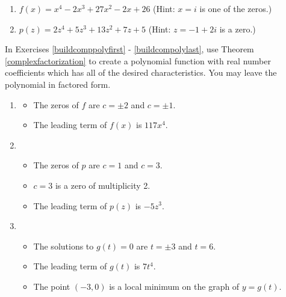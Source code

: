 \documentclass{ximera}
\begin{document}
\begin{enumerate}
\setcounter{enumi}{\value{HW}}

\item $f(x) = x^{4} - 2x^{3} + 27x^{2} - 2x + 26$ (Hint: $x = i$ is one of the zeros.)
\item  $p(z) = 2z^4+5z^3+13z^2+7z+5$ (Hint:  $z = -1+2i$ is a zero.) \label{compfactpolylast}

\setcounter{HW}{\value{enumi}}
\end{enumerate}

In Exercises \ref{buildcomppolyfirst} - \ref{buildcompolylast}, use Theorem \ref{complexfactorization} to create a polynomial function with real number coefficients which has all of the desired characteristics.  You may leave the polynomial in factored form. 

\begin{enumerate}
\setcounter{enumi}{\value{HW}}

\item  \label{buildcomppolyfirst}

\begin{itemize}

\item The zeros of $f$ are $c = \pm 2$ and $c = \pm 1$.
\item The leading term of $f(x)$ is $117x^4$.

\end{itemize}

\item

\begin{itemize}

\item The zeros of $p$ are $c=1$ and $c = 3$.
\item $c=3$ is a zero of multiplicity 2.
\item The leading term of $p(z)$ is $-5z^3$.

\end{itemize}

\item

\begin{itemize}

\item The solutions to $g(t) = 0$ are $t = \pm 3$ and $t=6$.
\item The leading term of $g(t)$ is $7t^4$.
\item The point $(-3,0)$ is a local minimum on the graph of $y=g(t)$.


\end{itemize}
\end{enumerate}
\end{document}
